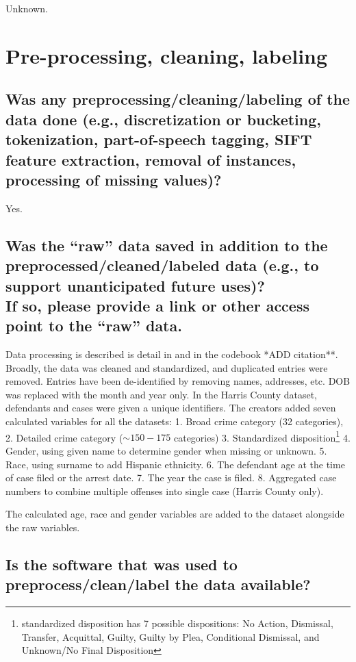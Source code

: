 \documentclass[letterpaper, 10 pt, conference]{ieeeconf}  %
\newcommand{\subtitle}[1]{{\\ \small \normalfont \color{purple} #1}}
\begin{document}
Unknown. 

\section{Pre-processing, cleaning, labeling}

\subsection{Was any preprocessing/cleaning/labeling of the data done (e.g., discretization or bucketing, tokenization, part-of-speech tagging, SIFT feature extraction, removal of instances, processing of missing values)?}

Yes. 

\subsection{Was the “raw” data saved in addition to the preprocessed/cleaned/labeled data (e.g., to support unanticipated future uses)? \subtitle{If so, please provide a link or other access point to the “raw” data. }}

Data processing is described is detail in \cite{ormachea2015new} and in the codebook *ADD citation**. Broadly, the data was cleaned and standardized, and duplicated entries were removed. Entries have been de-identified by removing names, addresses, etc. DOB was replaced with the month and year only. In the Harris County dataset, defendants and cases were given a unique identifiers. The creators added seven calculated variables for all the datasets: 
1. Broad crime category (32 categories), 
2. Detailed crime category ($\sim 150-175$ categories)
3. Standardized disposition\footnote{standardized disposition has 7 possible dispositions: No Action, Dismissal, Transfer, Acquittal, Guilty, Guilty by Plea, Conditional Dismissal, and Unknown/No Final Disposition}
4. Gender, using given name to determine gender when missing or unknown.
5. Race, using surname to add Hispanic ethnicity.
6. The defendant age at the time of case filed or the arrest date.
7. The year the case is filed.
8. Aggregated case numbers to combine multiple offenses into single case (Harris County only).

The calculated age, race and gender variables are added to the dataset alongside the raw variables. 

\subsection{Is the software that was used to preprocess/clean/label the data available?} 
\end{document}
